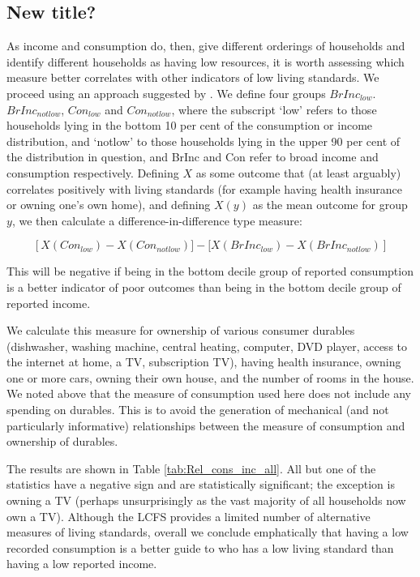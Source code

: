 \subsection{New title?}
As income and consumption do, then, give different orderings of households and identify different households as having low resources, it is worth assessing which measure better correlates with other indicators of low living standards. We proceed using an approach suggested by \citet{meyer2003measuring}.
We define four groups $BrInc_{low}$. $BrInc_{notlow}$, $Con_{low}$
and $Con_{notlow}$, where the subscript `low' refers to those households
lying in the bottom 10 per cent of the consumption or income distribution,
and `notlow' to those households lying in the upper 90 per cent of
the distribution in question, and BrInc
and Con refer to broad income and consumption respectively. Defining
$X$ as some outcome that (at least arguably) correlates positively
with living standards (for example having health insurance or owning
one's own home), and defining $X(y)$ as the mean outcome for group
$y$, we then calculate a difference-in-difference type measure:

\begin{equation}
\left[X(Con_{low})-X(Con_{notlow})] - [X(BrInc_{low})-X(BrInc_{notlow})\right]\label{eq:diffindiff}
\end{equation}


This will be negative if being in the bottom decile group of reported
consumption is a better indicator of poor outcomes than being in the
bottom decile group of reported income.

We calculate this measure for ownership of various consumer durables
(dishwasher, washing machine, central heating, computer, DVD player,
access to the internet at home, a TV, subscription TV), having health
insurance, owning one or more cars, owning their own house, and the
number of rooms in the house. We noted above that the measure of consumption
used here does not include any spending on durables. This is to avoid
the generation of mechanical (and not particularly informative) relationships
between the measure of consumption and ownership of durables.

The results are shown in Table \ref{tab:Rel_cons_inc_all}. All but
one of the statistics have a negative sign and are statistically significant;
the exception is owning a TV (perhaps unsurprisingly as the vast majority
of all households now own a TV). Although the LCFS provides
a limited number of alternative measures of living standards, overall
we conclude emphatically that having a low recorded consumption is
a better guide to who has a low living standard than having a low
reported income.

